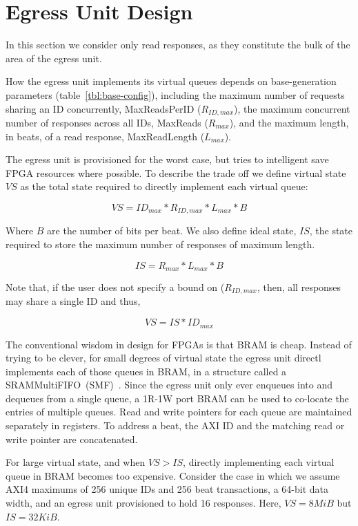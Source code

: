 \section{Egress Unit Design}\label{sec:egress}

In this section we consider only read responses, as they constitute the bulk of the area of the egress unit.

How the egress unit implements its virtual queues depends on base-generation
parameters (table~\ref{tbl:base-config}), including the maximum number of
requests sharing an ID concurrently,  MaxReadsPerID ($R_{ID,max}$), the maximum
concurrent number of responses across all IDs, MaxReads ($R_{max}$), and the
maximum length, in beats, of a read response, MaxReadLength ($L_{max}$).

The egress unit is provisioned for the worst case, but tries to intelligent
save FPGA resources where possible. To describe the trade off we define virtual
state $VS$ as the total state required to directly implement each virtual
queue:

$$VS = ID_{max}*R_{ID,max}*L_{max}*B$$

Where $B$ are the number of bits per beat. We also define ideal state, $IS$,
the state required to store the maximum number of responses of maximum length.

$$IS = R_{max}*L_{max}*B$$

Note that, if the user does not specify a bound on ($R_{ID,max}$, then, all
responses may share a single ID and thus,

$$VS = IS*ID_{max}$$

The conventional wisdom in design for FPGAs is that BRAM is cheap. Instead of
trying to be clever, for small degrees of virtual state the egress unit
directl implements each of those queues in BRAM, in a structure called a
SRAMMultiFIFO~(SMF)~\cite{LIFPGADesign}. Since the egress unit only ever enqueues into
and dequeues from a single queue, a 1R-1W port BRAM can be used to
co-locate the entries of multiple queues.  Read and write pointers for each
queue are maintained separately in registers. To address a beat, the AXI ID and
the matching read or write pointer are concatenated.

For large virtual state, and when $VS > IS$, directly implementing each virtual
queue in BRAM becomes too expensive. Consider the case in which we assume AXI4
 maximums of 256 unique IDs and 256 beat transactions, a 64-bit data width, and an egress unit provisioned to hold 16 responses. Here, $VS =
8MiB$ but $IS = 32 KiB$.


